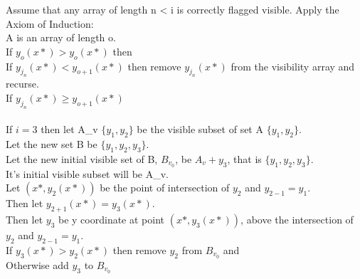 \documentclass{article}
\begin{document}
Assume that any array of length n < i is correctly flagged visible.
Apply the Axiom of Induction:\\
A is an array of length o.\\

If $y_o (x*) > y_o (x*)$ then \\
If $y_{j_n}(x*) < y_{o + 1} (x*)$ then remove $y_{j_n}(x*)$ from the visibility array and recurse.\\
If $y_{j_n}(x*) \geq y_{o + 1} (x*)$\\
\\
If $i = 3$ then let A_v $\{y_1, y_2\}$ be the visible subset of set A $\{y_1, y_2\}$.\\
Let the new set B be $\{y_1, y_2, y_3\}$.\\
Let the new initial visible set of B, $B_{v_{0}}$, be $A_v + y_3$, that is $\{y_1, y_2, y_3\}$.\\
It's initial visible subset will be A_v.\\
Let $(x*, y_2 (x*))$ be the point of intersection of $y_2$ and $y_{2 - 1} = y_1$.\\
Then let $y_{2 + 1} (x*) = y_3 (x*)$.\\
Then let $y_3$ be y coordinate at point $(x*, y_3 (x*))$, above the intersection of $y_2$ and $y_{2 - 1} = y_1$.\\
If $y_3 (x*) > y_2 (x*)$ then remove $y_2$ from $B_{v_0}$ and \\
Otherwise add $y_3$ to $B_{v_0}$\\
\end{document}
